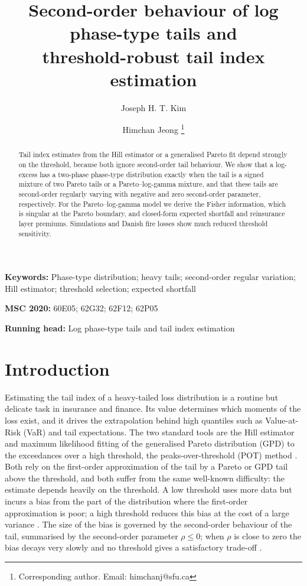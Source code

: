 \documentclass[12pt]{article}
\title{Second-order behaviour of log phase-type tails and\\ threshold-robust tail index estimation}
\author[a]{Joseph H. T. Kim}
\author[b,c]{Himchan Jeong \thanks{Corresponding author. Email: himchanj@sfu.ca}}
\affil[a]{Department of Applied Statistics, Yonsei University, Seoul, Korea}
\affil[b]{Department of Statistics and Actuarial Science, Simon Fraser University, Burnaby, BC, Canada}
\affil[c]{Department of Next Generation Smart Energy System Convergence, Gachon University, Korea}
\date{}
\newcommand{\runninghead}{Log phase-type tails and tail index estimation}%
\theoremstyle{definition}
\theoremstyle{remark}
\begin{document}
\maketitle
\doublespacing
\linenumbers

\begin{abstract}
\noindent Tail index estimates from the Hill estimator or a generalised Pareto fit depend strongly on the threshold, because both ignore second-order tail behaviour. We show that a log-excess has a two-phase phase-type distribution exactly when the tail is a signed mixture of two Pareto tails or a Pareto--log-gamma mixture, and that these tails are second-order regularly varying with negative and zero second-order parameter, respectively. For the Pareto--log-gamma model we derive the Fisher information, which is singular at the Pareto boundary, and closed-form expected shortfall and reinsurance layer premiums. Simulations and Danish fire losses show much reduced threshold sensitivity.
\end{abstract}

\noindent\textbf{Keywords:} Phase-type distribution; heavy tails; second-order regular variation; Hill estimator; threshold selection; expected shortfall

\noindent\textbf{MSC 2020:} 60E05; 62G32; 62F12; 62P05

\noindent\textbf{Running head:} \runninghead

\section{Introduction}\label{sec:intro}

Estimating the tail index of a heavy-tailed loss distribution is a routine but delicate task in insurance and finance. Its value determines which moments of the loss exist, and it drives the extrapolation behind high quantiles such as Value-at-Risk (VaR) and tail expectations. The two standard tools are the Hill estimator \citep{Hill1975} and maximum likelihood fitting of the generalised Pareto distribution (GPD) to the exceedances over a high threshold, the peaks-over-threshold (POT) method \citep{BalkemaDeHaan1974,Pickands1975,Smith1987,McNeil1997}. Both rely on the first-order approximation of the tail by a Pareto or GPD tail above the threshold, and both suffer from the same well-known difficulty: the estimate depends heavily on the threshold. A low threshold uses more data but incurs a bias from the part of the distribution where the first-order approximation is poor; a high threshold reduces this bias at the cost of a large variance \citep{Embrechts1997,Beirlant2004,ScarrottMacDonald2012}. The size of the bias is governed by the second-order behaviour of the tail, summarised by the second-order parameter $\rho\le 0$; when $\rho$ is close to zero the bias decays very slowly and no threshold gives a satisfactory trade-off \citep{Drees2000,DeHaanFerreira2006}.
\end{document}

